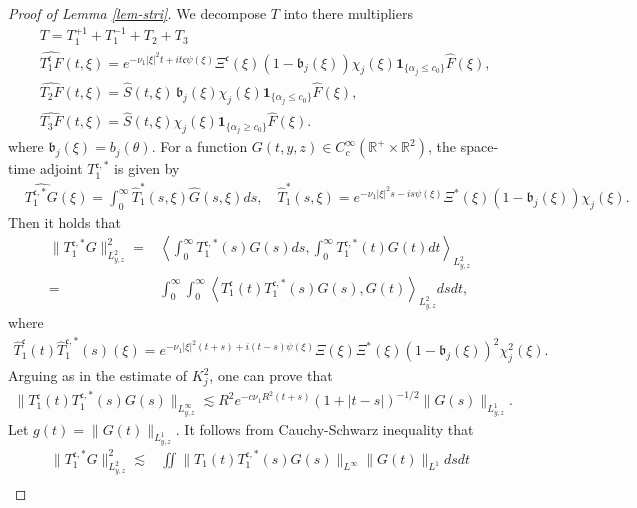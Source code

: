 \documentclass[12pt]{article}
\numberwithin{equation}{section}
\begin{document}
\begin{proof}[Proof of Lemma \ref{lem-stri}]
  	We decompose $T$ into there multipliers
  	\begin{align*}
    &T=T^{+1}_{1}+T_1^{-1}+T_2+T_3\\
  		&\widehat{T^{\mathfrak{c}}_1F}(t,\xi)=e^{-\nu_1|\xi|^2t+ it\mathfrak{c}\psi(\xi)}\Xi^{\mathfrak{c}}(\xi)(1-\mathfrak{b}_j(\xi))\chi_j(\xi)\mathbf{1}_{\{\alpha_j\leq c_0\}}\hat{F}(\xi),\\
  		&\widehat{T_2F}(t,\xi)=\hat{S}(t,\xi)\,\mathfrak{b}_j(\xi)\chi_j(\xi) \mathbf{1}_{\{\alpha_j\leq c_0\}}\hat{F}(\xi),\\
  		&\widehat{T_3F}(t,\xi)=\hat{S}(t,\xi)\chi_j(\xi) \mathbf{1}_{\{\alpha_j\geq c_0\}}\hat{F}(\xi).
  	\end{align*}
  	where $\mathfrak{b}_j(\xi)=b_j(\theta)$. 
  	For a function $G(t,y,z)\in C_c^{\infty}(\mathbb{R}^+\times\mathbb{R}^2)$, the space-time adjoint $T_1^{\mathfrak{c},*}$ is given by
  	\begin{align*}
  		&\widehat{T_1^{\mathfrak{c},*}G}(\xi)=\int_{0}^{\infty}\hat{T}_1^*(s,\xi)\hat{G}(s,\xi) ds,\quad\hat{T}_1^*(s,\xi)=e^{-\nu_1|\xi|^2s- is\psi(\xi)}\Xi^*(\xi)(1-\mathfrak{b}_j(\xi))\chi_j(\xi).
  	\end{align*}
  	Then it holds that
  	\begin{align*}
  		\|T_1^{\mathfrak{c},*}G\|_{L^2_{y,z}}^2=&\left\langle \int_0^{\infty} T_1^{\mathfrak{c},*}(s)G(s)ds,\int_0^{\infty} T_1^{\mathfrak{c},*}(t)G(t)dt\right\rangle_{L^2_{y,z}}\\
  		=&\int_{0}^{\infty}\int_{0}^{\infty}\left\langle T^{\mathfrak{c}}_1(t)T^{\mathfrak{c},*}_1(s)G(s),G(t)\right\rangle_{L^2_{y,z}}dsdt,
  	\end{align*}
  	where
  	\begin{align*}
  		\hat{T}^{\mathfrak{c}}_1(t)\hat{T}_1^{\mathfrak{c},*}(s)(\xi)=e^{-\nu_1|\xi|^2(t+s)+ i(t-s)\psi(\xi)}\Xi(\xi)\Xi^*(\xi)(1-\mathfrak{b}_j(\xi))^2\chi_j^2(\xi).
  	\end{align*}
  	Arguing as in the estimate of $K^2_j$, one can prove that
  	\begin{align*}
  		\|T^{\mathfrak{c}}_1(t)T_1^{\mathfrak{c},*}(s)G(s)\|_{L^{\infty}_{y,z}}\lesssim R^2e^{-c\nu_1R^2(t+s)}(1+|t-s|)^{-1/2}\|G(s)\|_{L^1_{y,z}}.
  	\end{align*}
  	Let $g(t)=\|G(t)\|_{L^1_{y,z}}$. It follows from Cauchy-Schwarz inequality that
  	\begin{align*}
  		\|T_1^{\mathfrak{c},*}G\|_{L^2_{y,z}}^2\lesssim&\iint\|T_1(t)T_1^{\mathfrak{c},*}(s)G(s)\|_{L^\infty}\|G(t)\|_{L^1}dsdt\\

\end{align*}
\end{proof}
\end{document}
